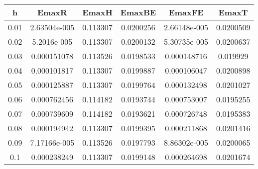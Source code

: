 \begin{table}[H] 
\centering 
\begin{tabular}{cccccc} 
h & EmaxR & EmaxH & EmaxBE & EmaxFE & EmaxT \\ \toprule 
 0.01 & 2.63504e-005 & 0.113307 & 0.0200256 & 2.66148e-005 & 0.0200509 \\ \midrule 
 0.02 & 5.2016e-005 & 0.113307 & 0.0200132 & 5.30735e-005 & 0.0200637 \\ \midrule 
 0.03 & 0.000151078 & 0.113526 & 0.0198533 & 0.000148716 & 0.019929 \\ \midrule 
 0.04 & 0.000101817 & 0.113307 & 0.0199887 & 0.000106047 & 0.0200898 \\ \midrule 
 0.05 & 0.000125887 & 0.113307 & 0.0199764 & 0.000132498 & 0.0201027 \\ \midrule 
 0.06 & 0.000762456 & 0.114182 & 0.0193744 & 0.000753007 & 0.0195255 \\ \midrule 
 0.07 & 0.000739609 & 0.114182 & 0.0193621 & 0.000726748 & 0.0195383 \\ \midrule 
 0.08 & 0.000194942 & 0.113307 & 0.0199395 & 0.000211868 & 0.0201416 \\ \midrule 
 0.09 & 7.17166e-005 & 0.113526 & 0.0197793 & 8.86302e-005 & 0.0200065 \\ \midrule 
 0.1 & 0.000238249 & 0.113307 & 0.0199148 & 0.000264698 & 0.0201674 \\ \midrule 
\end{tabular} 
\end{table} 
